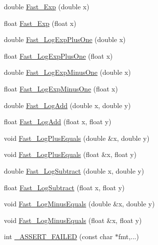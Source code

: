 \begin{DoxyCompactItemize}
\item 
double \hyperlink{namespace_c_o_n_t_r_a_l_i_g_n_a0471adf771f411caa63052dc9d5dd7c0}{Fast\+\_\+\+Exp} (double x)
\item 
float \hyperlink{namespace_c_o_n_t_r_a_l_i_g_n_a00c672ebb0a129f6949436e11b4d2963}{Fast\+\_\+\+Exp} (float x)
\item 
double \hyperlink{namespace_c_o_n_t_r_a_l_i_g_n_ad082406a2c15bf172a3775ea2a21110d}{Fast\+\_\+\+Log\+Exp\+Plus\+One} (double x)
\item 
float \hyperlink{namespace_c_o_n_t_r_a_l_i_g_n_a4b02039d31911aca06afcd9378327353}{Fast\+\_\+\+Log\+Exp\+Plus\+One} (float x)
\item 
double \hyperlink{namespace_c_o_n_t_r_a_l_i_g_n_ac590e8506425b9a04fa9516a98a9475e}{Fast\+\_\+\+Log\+Exp\+Minus\+One} (double x)
\item 
float \hyperlink{namespace_c_o_n_t_r_a_l_i_g_n_aedd3ba0366cc273ba3ccc198f78e7415}{Fast\+\_\+\+Log\+Exp\+Minus\+One} (float x)
\item 
double \hyperlink{namespace_c_o_n_t_r_a_l_i_g_n_a7367cbf3b6f0971fe91f968df4e1ccfd}{Fast\+\_\+\+Log\+Add} (double x, double y)
\item 
float \hyperlink{namespace_c_o_n_t_r_a_l_i_g_n_a1f9990fb16821f775893785608a1828a}{Fast\+\_\+\+Log\+Add} (float x, float y)
\item 
void \hyperlink{namespace_c_o_n_t_r_a_l_i_g_n_a049b1ad00fa83ec722de8e96112840d0}{Fast\+\_\+\+Log\+Plus\+Equals} (double \&x, double y)
\item 
void \hyperlink{namespace_c_o_n_t_r_a_l_i_g_n_a3b315eff1e5eb5bb831046aa329b8f6a}{Fast\+\_\+\+Log\+Plus\+Equals} (float \&x, float y)
\item 
double \hyperlink{namespace_c_o_n_t_r_a_l_i_g_n_aa41663bbe3c2b32100e9025ff68eb7db}{Fast\+\_\+\+Log\+Subtract} (double x, double y)
\item 
float \hyperlink{namespace_c_o_n_t_r_a_l_i_g_n_ad85a3076602843900172f6a9579e7cde}{Fast\+\_\+\+Log\+Subtract} (float x, float y)
\item 
void \hyperlink{namespace_c_o_n_t_r_a_l_i_g_n_ac312a17e4a8d1e2cdcf973a8b219d31a}{Fast\+\_\+\+Log\+Minus\+Equals} (double \&x, double y)
\item 
void \hyperlink{namespace_c_o_n_t_r_a_l_i_g_n_a9cc2eca1e44a1a21f44bd44933281031}{Fast\+\_\+\+Log\+Minus\+Equals} (float \&x, float y)
\item 
int \hyperlink{namespace_c_o_n_t_r_a_l_i_g_n_a338a4c4e7404ab754609c2b78623a756}{\+\_\+\+A\+S\+S\+E\+R\+T\+\_\+\+F\+A\+I\+L\+E\+D} (const char $\ast$fmt,...)

\end{DoxyCompactItemize}
